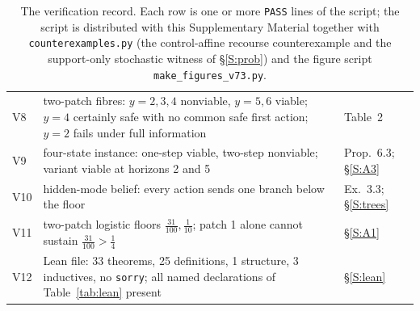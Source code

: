 \begin{table}[htbp]
\begin{tabularx}{\textwidth}{@{}l>{\raggedright\arraybackslash}X>{\raggedright\arraybackslash}p{}@{}}
V8 & two-patch fibres: $y=2,3,4$ nonviable, $y=5,6$ viable; $y=4$ certainly safe with no common safe first action; $y=2$ fails under full information & Table~2\\
V9 & four-state instance: one-step viable, two-step nonviable; variant viable at horizons 2 and 5 & Prop.~6.3; \S\ref{S:A3}\\
V10 & hidden-mode belief: every action sends one branch below the floor & Ex.~3.3; \S\ref{S:trees}\\
V11 & two-patch logistic floors $\tfrac{31}{100},\tfrac1{10}$; patch 1 alone cannot sustain $\tfrac{31}{100}>\tfrac14$ & \S\ref{S:A1}\\
V12 & Lean file: 33 theorems, 25 definitions, 1 structure, 3 inductives, no \texttt{sorry}; all named declarations of Table~\ref{tab:lean} present & \S\ref{S:lean}\\
\bottomrule
\end{tabularx}
\caption{The verification record. Each row is one or more \texttt{PASS} lines of the script; the script is distributed with this Supplementary Material together with \texttt{counterexamples.py} (the control-affine recourse counterexample and the support-only stochastic witness of \S\ref{S:prob}) and the figure script \texttt{make\_figures\_v73.py}.}
\label{tab:record}
\end{table}
